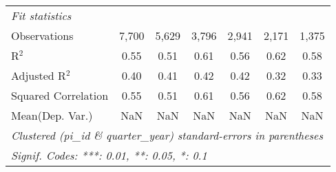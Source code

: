\begin{tabular}{lcccccc}
   \midrule
   \emph{Fit statistics}\\
   Observations                                               & 7,700       & 5,629        & 3,796         & 2,941         & 2,171        & 1,375\\  
   R$^2$                                                      & 0.55        & 0.51         & 0.61          & 0.56          & 0.62         & 0.58\\  
   Adjusted R$^2$                                             & 0.40        & 0.41         & 0.42          & 0.42          & 0.32         & 0.33\\  
   Squared Correlation                                        & 0.55        & 0.51         & 0.61          & 0.56          & 0.62         & 0.58\\  
Mean(Dep. Var.) & NaN & NaN & NaN & NaN & NaN & NaN \\
   \midrule \midrule
   \multicolumn{7}{l}{\emph{Clustered (pi\_id \& quarter\_year) standard-errors in parentheses}}\\
   \multicolumn{7}{l}{\emph{Signif. Codes: ***: 0.01, **: 0.05, *: 0.1}}\\
\end{tabular}
\par\endgroup
